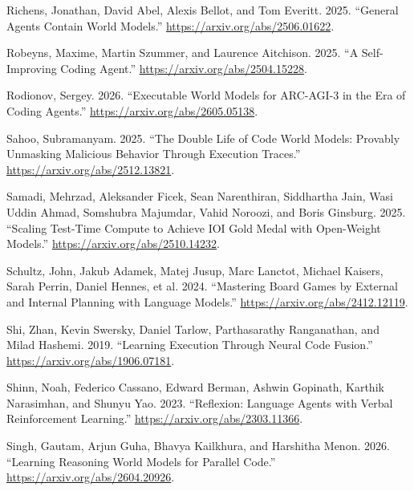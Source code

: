 \documentclass{article}
\newlength{\cslhangindent}
\newenvironment{CSLReferences}[2]
 {%
  \setlength{\parindent}{0pt}
  \everypar{\setlength{\hangindent}{\cslhangindent}}\ignorespaces
 }
 {\par}
\begin{document}
\begin{CSLReferences}{1}{0}
\leavevmode{}%
Richens, Jonathan, David Abel, Alexis Bellot, and Tom Everitt. 2025.
{``General Agents Contain World Models.''}
\url{https://arxiv.org/abs/2506.01622}.

\leavevmode{}%
Robeyns, Maxime, Martin Szummer, and Laurence Aitchison. 2025. {``A
Self-Improving Coding Agent.''} \url{https://arxiv.org/abs/2504.15228}.

\leavevmode{}%
Rodionov, Sergey. 2026. {``Executable World Models for ARC-AGI-3 in the
Era of Coding Agents.''} \url{https://arxiv.org/abs/2605.05138}.

\leavevmode{}%
Sahoo, Subramanyam. 2025. {``The Double Life of Code World Models:
Provably Unmasking Malicious Behavior Through Execution Traces.''}
\url{https://arxiv.org/abs/2512.13821}.

\leavevmode{}%
Samadi, Mehrzad, Aleksander Ficek, Sean Narenthiran, Siddhartha Jain,
Wasi Uddin Ahmad, Somshubra Majumdar, Vahid Noroozi, and Boris Ginsburg.
2025. {``Scaling Test-Time Compute to Achieve IOI Gold Medal with
Open-Weight Models.''} \url{https://arxiv.org/abs/2510.14232}.

\leavevmode{}%
Schultz, John, Jakub Adamek, Matej Jusup, Marc Lanctot, Michael Kaisers,
Sarah Perrin, Daniel Hennes, et al. 2024. {``Mastering Board Games by
External and Internal Planning with Language Models.''}
\url{https://arxiv.org/abs/2412.12119}.

\leavevmode{}%
Shi, Zhan, Kevin Swersky, Daniel Tarlow, Parthasarathy Ranganathan, and
Milad Hashemi. 2019. {``Learning Execution Through Neural Code
Fusion.''} \url{https://arxiv.org/abs/1906.07181}.

\leavevmode{}%
Shinn, Noah, Federico Cassano, Edward Berman, Ashwin Gopinath, Karthik
Narasimhan, and Shunyu Yao. 2023. {``Reflexion: Language Agents with
Verbal Reinforcement Learning.''}
\url{https://arxiv.org/abs/2303.11366}.

\leavevmode{}%
Singh, Gautam, Arjun Guha, Bhavya Kailkhura, and Harshitha Menon. 2026.
{``Learning Reasoning World Models for Parallel Code.''}
\url{https://arxiv.org/abs/2604.20926}.


\end{CSLReferences}
\end{document}
